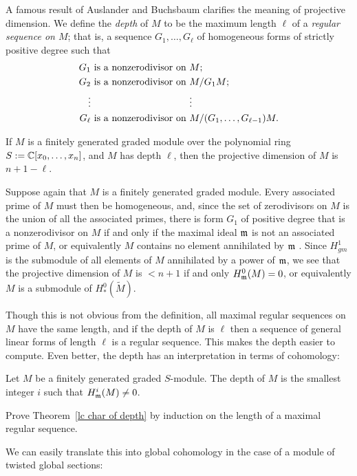 A famous result of Auslander and Buchsbaum clarifies the meaning of projective dimension. We define the 
\emph{depth} of $M$ to be the maximum length $\ell$ of a \emph{regular sequence on $M$}; that is, a sequence $G_{1},\dots,G_{\ell}$ of homogeneous forms of strictly positive degree such that 
\begin{align*}
G_{1} &\hbox{ is a nonzerodivisor on } M;\\
G_{2} &\hbox{ is a nonzerodivisor on } M/G_{1}M;\\
\vdots&\phantom{\hbox{ is a nonzerodivisor on } }\vdots\\
G_{\ell} &\hbox{ is a nonzerodivisor on } M/(G_{1},\dots,G_{\ell-1})M.
\end{align*}

\begin{theorem}
If $M$ is a finitely generated graded module over the polynomial ring $S := \CC[x_{0},\dots,x_{n}]$, and $M$ has depth $\ell$, then the projective dimension of $M$ is $n+1-\ell$.
\end{theorem}


Suppose again that $M$ is a finitely generated graded module. Every associated prime of $M$ must then be homogeneous, and, since the set of zerodivisors on $M$ is the union of all the associated primes,  there is form $G_{1}$ of positive degree that is a nonzerodivisor on $M$ if and only if the maximal ideal $\gm$ is not an associated prime of $M$, or equivalently $M$ contains no element annihilated by $\gm$ . Since $H^{1}_{gm}$ is the submodule of all elements of $M$ annihilated by a power of $\gm$, we see that
the projective dimension of $M$ is $< n+1$ if and only $H^{0}_{\gm}(M) = 0$, or equivalently
$M$ is a submodule of $H^{0}_{*}(\widetilde M)$.

Though this is not obvious from the definition, all maximal regular sequences on $M$ have the same length, and if the depth of $M$ is $\ell$ then a sequence of general linear forms of length $\ell$ is a regular sequence. This makes the depth easier to compute. Even better, the depth has an interpretation in terms of  cohomology:

\begin{theorem}\label{lc char of depth}
Let $M$ be a finitely generated graded $S$-module. The depth of $M$ is the smallest integer $i$ such that $H^{i}_{\gm}(M) \neq 0$.
\end{theorem}
 
 
\begin{exercise}
 Prove Theorem~\ref{lc char of depth} by induction on the length of a maximal regular sequence.
\end{exercise}
We can easily translate this into global cohomology in the case of a module of twisted global sections:

